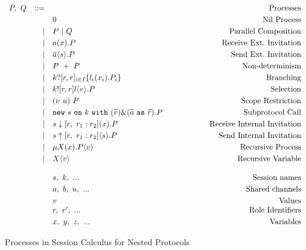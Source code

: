 \documentclass[12pt,twoside]{report}
\newcommand{\white}{\ \ \ \ \ \ \ \ \ \ \ \ }
\begin{document}
\begin{figure}[h]
    \centering
    \begin{equation*}
    \centering
    \begin{array}{rrlcr}
        P,\ Q & ::= && \white & \text{Processes} \\[2.75pt]
             &   & 0 & \white & \text{Nil\ Process}  \\[2.75pt]
             & | & P\ |\ Q & \white & \text{Parallel\ Composition}  \\[2.75pt]
             & | & a(x).P & \white & \text{Receive\ Ext.\ Invitation} \\[2.75pt]
             & | & \overline{a}\langle s \rangle.P & \white & \text{Send\ Ext.\ Invitation} \\[2.75pt]
             & | & P\ +\ P & \white & \text{Non-determinism}\\[2.75pt]
             & | & k?[r, r]_{i \in I} \{l_i(x_i).P_i\}& \white & \text{Branching} \\[2.75pt]
             & | & k![r, r]l \langle v \rangle.P & \white & \text{Selection} \\[2.75pt]
             & | & (\nu\ u)\ P & \white & \text{Scope\ Restriction}\\[2.75pt] 
             & | & \texttt{new}\ s\ \texttt{on}\ k\ \texttt{with}\ (\widetilde{v})\&(\widetilde{a}\ \texttt{as}\ \widetilde{r}).P & \white & \text{Subprotocol\ Call}\\[2.75pt]
             & | & s \downarrow [r,\ r_1 : r_2](x).P & \white & \text{Receive\ Internal\ Invitation}\\[2.75pt]
             & | & s \uparrow [r,\ r_1 : r_2]\langle s \rangle.P & \white & \text{Send\ Internal\ Invitation}\\[2.75pt]
             & | & \mu X(x).P\langle v \rangle & \white  & \text{Recursive\ Process} \\[2.75pt]
             & | & X\langle v \rangle & \white  & \text{Recursive\ Variable}\\\\

        &&s,\ k,\ ... & \white & \text{Session\ names}\\[2.75pt]
        &&a,\ b,\ u,\ ... & \white & \text{Shared\ channels}\\[2.75pt]
        &&v & \white & \text{Values}\\
        &&r,\ r',\ ... & \white & \text{Role\ Identifiers}\\[2.75pt]
        &&x,\ y,\ z,\ ... & \white & \text{Variables}
        \end{array}
    \end{equation*}
    \caption{Processes in Session Calculus for Nested Protocols}
    \label{nested_session_calculus}
\end{figure}{}
\end{document}
